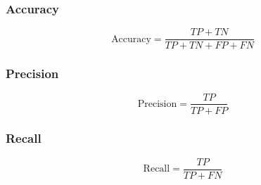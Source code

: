 \documentclass[conference]{IEEEtran}
\begin{document}
\subsubsection{Accuracy}
\begin{equation}
\text{Accuracy} = \frac{TP + TN}{TP + TN + FP + FN}
\end{equation}

\subsubsection{Precision}
\begin{equation}
\text{Precision} = \frac{TP}{TP + FP}
\end{equation}

\subsubsection{Recall}
\begin{equation}
\text{Recall} = \frac{TP}{TP + FN}
\end{equation}
\end{document}
